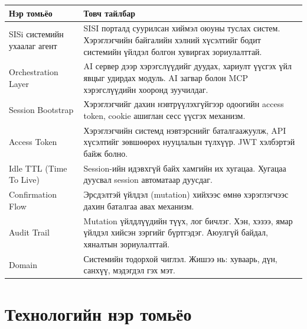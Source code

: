 \begin{table}[H]
  \centering
  \begin{tabularx}{\textwidth}{>{\raggedright\arraybackslash}p{4.5cm} X}
    \toprule
    Нэр томьёо & Товч тайлбар \\
    \midrule
    SISi системийн ухаалаг агент & SISI порталд суурилсан хиймэл оюуны туслах систем. Хэрэглэгчийн байгалийн хэлний хүсэлтийг бодит системийн үйлдэл болгон хувиргах зориулалттай. \\
    \addlinespace
    Orchestration Layer & AI сервер дээр хэрэгслүүдийг дуудах, хариулт үүсгэх үйл явцыг удирдах модуль. AI загвар болон MCP хэрэгслүүдийн хооронд зуучилдаг. \\
    \addlinespace
    Session Bootstrap & Хэрэглэгчийг дахин нэвтрүүлэхгүйгээр одоогийн access token, cookie ашиглан сесс үүсгэх механизм. \\
    \addlinespace
    Access Token & Хэрэглэгчийн системд нэвтэрснийг баталгаажуулж, API хүсэлтийг зөвшөөрөх нууцлалын түлхүүр. JWT хэлбэртэй байж болно. \\
    \addlinespace
    Idle TTL (Time To Live) & Session-ийн идэвхгүй байх хамгийн их хугацаа. Хугацаа дуусвал session автоматаар дуусдаг. \\
    \addlinespace
    Confirmation Flow & Эрсдэлтэй үйлдэл (mutation) хийхээс өмнө хэрэглэгчээс дахин баталгаа авах механизм. \\
    \addlinespace
    Audit Trail & Mutation үйлдлүүдийн түүх, лог бичлэг. Хэн, хэзээ, ямар үйлдэл хийсэн зэргийг бүртгэдэг. Аюулгүй байдал, хяналтын зориулалттай. \\
    \addlinespace
    Domain & Системийн тодорхой чиглэл. Жишээ нь: хуваарь, дүн, санхүү, мэдэгдэл гэх мэт. \\
    \bottomrule
  \end{tabularx}
\end{table}

\section*{Технологийн нэр томьёо}

